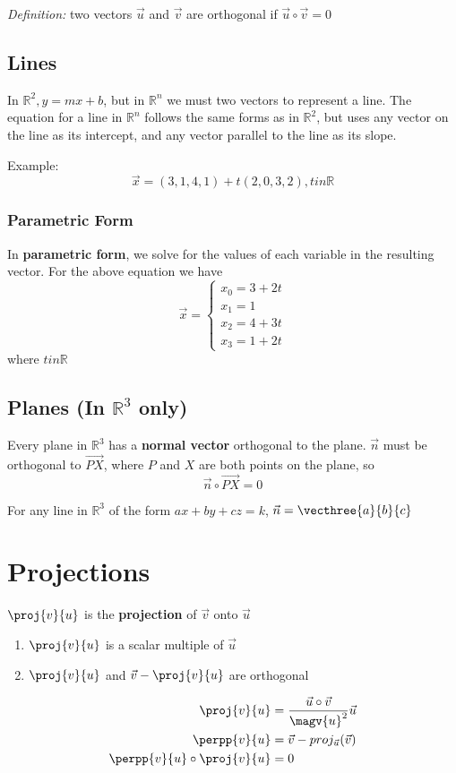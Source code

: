 \documentclass[12pt]{article}
\newcommand{\R}[1]{\mathbb{R}^{#1}}
\begin{document}
\textit{Definition:} two vectors $\vec{u}$ and $\vec{v}$ are orthogonal if $\vec{u}\circ\vec{v} = 0$

\subsection*{Lines}
In $\R{2}, y = mx + b$, but in $\R{n}$ we must two vectors to represent a line. The equation for a line in $\R{n}$ follows the same forms as in $\R{2}$, but uses any vector on the line as its intercept, and any vector parallel to the line as its slope.

Example: \[ \vec{x} = (3,1,4,1) + t(2,0,3,2), tin\mathbb{R} \]

\subsubsection*{Parametric Form}
In {\bf parametric form}, we solve for the values of each variable in the resulting vector. For the above equation we have
\[ \vec{x} =
  \begin{cases}
   x_0 = 3 + 2t\\
   x_1 = 1\\
   x_2 = 4 + 3t\\
   x_3 = 1 + 2t
  \end{cases}
\]
where $tin\mathbb{R}$

\subsection*{Planes (In $\R{3}$ only)}
Every plane in $\R{3}$ has a {\bf normal vector} orthogonal to the plane. $\vec{n}$ must be orthogonal to $\vec{PX}$, where $P$ and $X$ are both points on the plane, so \[ \vec{n}\circ\vec{PX}=0 \]

For any line in $\R{3}$ of the form $ax + by + cz = k$, $\vec{n} = \vecthree{a}{b}{c}$

\section*{Projections}
$\proj{v}{u}$ is the {\bf projection} of $\vec{v}$ onto $\vec{u}$
\begin{enumerate}
\item $\proj{v}{u}$ is a scalar multiple of $\vec{u}$
\item $\proj{v}{u}$ and $\vec{v} - \proj{v}{u}$ are orthogonal
\end{enumerate}

\begin{align*}
\proj{v}{u} &= \frac{\vec{u}\circ\vec{v}}{\magv{u}^2}\vec{u}\\
\perpp{v}{u} &= \vec{v} - proj_{\vec{u}}(\vec{v})\\
\perpp{v}{u}\circ\proj{v}{u} &= 0
\end{align*}
\end{document}
